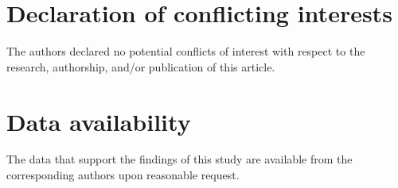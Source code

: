 \documentclass[review]{elsarticle}
\begin{document}
\section*{Declaration of conflicting interests}
The authors declared no potential conflicts of interest with respect to the research, authorship, and/or publication of this article.

\section*{Data availability}
The data that support the findings of this study are available from the corresponding authors upon reasonable request.


\end{document}
